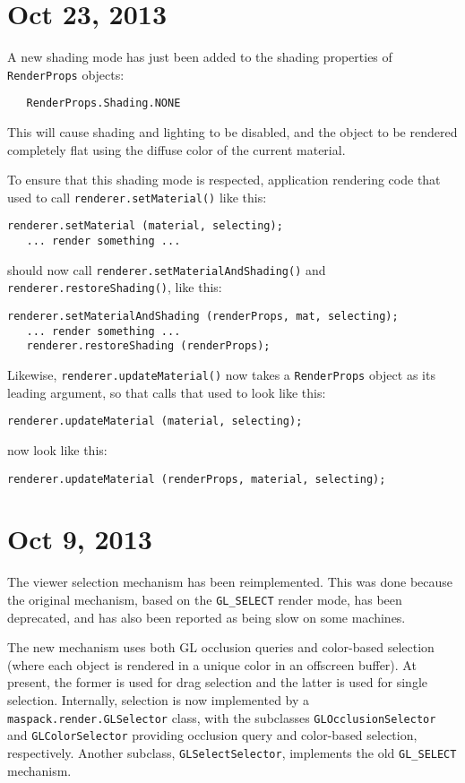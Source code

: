 \documentclass{article}
\begin{document}
\section*{Oct 23, 2013}

A new shading mode has just been added to the shading properties
of {\tt RenderProps} objects:
\begin{verbatim}
   RenderProps.Shading.NONE
\end{verbatim}
This will cause shading and lighting to be disabled, and the
object to be rendered completely flat using the diffuse
color of the current material.

To ensure that this shading mode is respected, application
rendering code that used to call {\tt renderer.setMaterial()} like this:
\begin{lstlisting}[]
   renderer.setMaterial (material, selecting);
   ... render something ...
\end{lstlisting}
should now call {\tt renderer.setMaterialAndShading()} and 
{\tt renderer.restoreShading()},
like this:
\begin{lstlisting}[]
   renderer.setMaterialAndShading (renderProps, mat, selecting);
   ... render something ...
   renderer.restoreShading (renderProps);
\end{lstlisting}
Likewise, {\tt renderer.updateMaterial()} now takes a {\tt RenderProps}
object as its leading argument, so that calls that used to
look like this:
\begin{lstlisting}[]
   renderer.updateMaterial (material, selecting);
\end{lstlisting}
now look like this:
\begin{lstlisting}[]
   renderer.updateMaterial (renderProps, material, selecting);
\end{lstlisting}

\section*{Oct 9, 2013}

The viewer selection mechanism has been reimplemented. This was done
because the original mechanism, based on the {\tt GL\_SELECT} render
mode, has been deprecated, and has also been reported as being slow on
some machines.

The new mechanism uses both GL occlusion queries and color-based
selection (where each object is rendered in a unique color in an
offscreen buffer). At present, the former is used for drag selection
and the latter is used for single selection. Internally, selection is
now implemented by a {\tt maspack.render.GLSelector} class, with the
subclasses {\tt GLOcclusionSelector} and {\tt GLColorSelector}
providing occlusion query and color-based selection,
respectively. Another subclass, {\tt GLSelectSelector}, implements the
old {\tt GL\_SELECT} mechanism.
\end{document}
